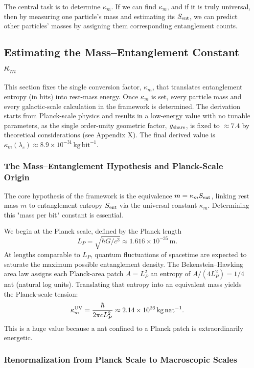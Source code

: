 \documentclass[11pt]{article}
\begin{document}
The central task is to determine $\kappa_m$. If we can find $\kappa_m$, and if it is truly universal, then by measuring one particle’s mass and estimating its $S_{\rm ent}$, we can predict other particles’ masses by assigning them corresponding entanglement counts.

\subsection{Estimating the Mass–Entanglement Constant $\kappa_m$}

This section fixes the single conversion factor, $\kappa_m$, that translates entanglement entropy (in bits) into rest-mass energy. Once $\kappa_m$ is set, every particle mass and every galactic-scale calculation in the framework is determined. The derivation starts from Planck-scale physics and results in a low-energy value with no tunable parameters, as the single order-unity geometric factor, $g_{\rm share}$, is fixed to $\approx 7.4$ by theoretical considerations (see Appendix X). The final derived value is $\kappa_m(\lambda_e) \approx 8.9 \times 10^{-31}\,\mathrm{kg\,bit}^{-1}$.

\subsubsection{The Mass–Entanglement Hypothesis and Planck-Scale Origin}

The core hypothesis of the framework is the equivalence $m = \kappa_m S_{\rm ent}$, linking rest mass $m$ to entanglement entropy $S_{\rm ent}$ via the universal constant $\kappa_m$. Determining this "mass per bit" constant is essential.

We begin at the Planck scale, defined by the Planck length
$$ L_P = \sqrt{\hbar G / c^3} \approx 1.616 \times 10^{-35}\,\mathrm{m}. $$
At lengths comparable to $L_P$, quantum fluctuations of spacetime are expected to saturate the maximum possible entanglement density. The Bekenstein–Hawking area law assigns each Planck-area patch $A=L_P^2$ an entropy of $A / (4 L_P^2) = 1/4$ nat (natural log units). Translating that entropy into an equivalent mass yields the Planck-scale tension:
$$ \kappa_m^{\rm UV} = \frac{\hbar}{2\pi c L_P^2} \approx 2.14 \times 10^{26}\,\mathrm{kg\,nat}^{-1}. $$
This is a huge value because a nat confined to a Planck patch is extraordinarily energetic.

\subsubsection{Renormalization from Planck Scale to Macroscopic Scales}
\end{document}
